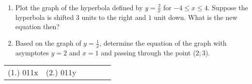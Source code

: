 \begin{eocexercises}{}
\begin{enumerate}
\item{Plot the graph of the hyperbola defined by $y = \frac{2}{x}$  for $-4 \leq x \leq 4$.  Suppose the hyperbola is shifted $3$ units to the right and $1$ unit down.  What is the new equation then?}
\item{Based on the graph of $y = \frac{1}{x}$, determine the equation of the graph with asymptotes $y = 2$ and $x = 1$ and passing through the point ($2; 3$).}
\end{enumerate}



\par \practiceinfo
\par \begin{tabular}[h]{cccccc}
(1.)	011x	&
(2.)	011y	&
\end{tabular}
\end{eocexercises}




